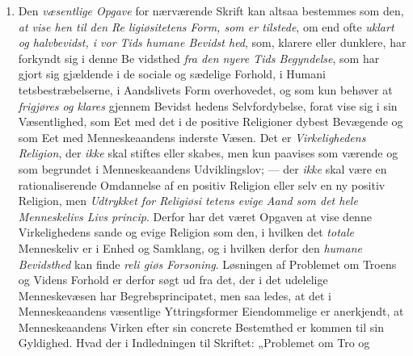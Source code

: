\begin{enumerate}[label=\arabic*., leftmargin=*, labelsep=1em,
                  topsep=0.35\baselineskip, itemsep=0.35\baselineskip]
\item Den \emph{væsentlige Opgave} for nærværende Skrift kan altsaa bestemmes som
  den, \emph{at vise hen til den Re\-%
ligiøsitetens Form, som er tilstede}, om end ofte
 \emph{uklart og halvbevidst, i vor Tids humane Bevidst\-%
hed}, som, klarere eller dunklere, har forkyndt sig i denne Be\-%
vidsthed \emph{fra den nyere Tids Begyndelse}, som har gjort sig gjældende i de
  sociale og sædelige Forhold, i Humani\-%
tetsbestræbelserne, i Aandslivets Form overhovedet, og som kun behøver at
  \emph{frigjøres og klares} gjennem Bevidst\-%
hedens Selvfordybelse, forat vise sig i sin Væsentlighed, som Eet med det i de
  positive Religioner dybest Bevægende og som Eet med Menneskeaandens inderste
  Væsen. Det er \emph{Virkelighedens Religion}, der \emph{ikke} skal stiftes
  eller skabes, men kun paavises som værende og som begrundet i Menneskeaandens
  Udviklingslov; --- der \emph{ikke} skal være en rationaliserende Omdannelse af
  en positiv Religion eller selv en ny positiv Religion, men \emph{Udtrykket for
  Religiøsi\-%
tetens evige Aand som det hele Menneskelivs Livs\-%
princip}. Derfor har det været Opgaven at vise denne Virkelighedens sande og
  evige Religion som den, i hvilken det \emph{totale} Menneskeliv er i Enhed og
  Samklang, og i hvilken derfor den \emph{humane Bevidsthed} kan finde
  \emph{reli\-%
giøs Forsoning}. Løsningen af Problemet om Troens og Videns Forhold er derfor
  søgt ud fra det, der i det udelelige Menneskevæsen har Begrebsprincipatet, men
  saa\-%
ledes, at det i Menneskeaandens væsentlige Yttringsformer Eiendommelige er
  anerkjendt, at Menneskeaandens Virken efter sin concrete Bestemthed er kommen
  til sin Gyldighed. Hvad der i Indledningen til Skriftet: „Problemet om Tro og

\end{enumerate}

